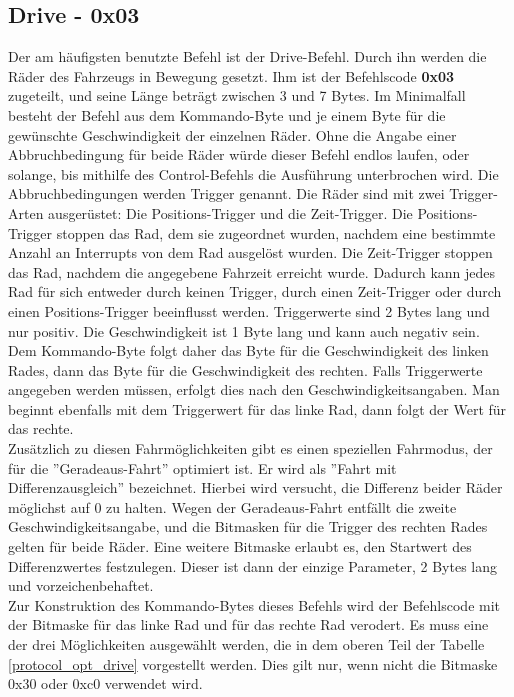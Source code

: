\subsection{Drive - 0x03}
Der am häufigsten benutzte Befehl ist der Drive-Befehl. Durch ihn werden die Räder des Fahrzeugs
in Bewegung gesetzt. Ihm ist der Befehlscode \textbf{0x03} zugeteilt, und seine Länge beträgt zwischen 3
und 7 Bytes. Im Minimalfall besteht der Befehl aus dem Kommando-Byte und je einem Byte für
die gewünschte Geschwindigkeit der einzelnen Räder. Ohne die Angabe einer Abbruchbedingung für
beide Räder würde dieser Befehl endlos laufen, oder solange, bis mithilfe des Control-Befehls
die Ausführung unterbrochen wird. Die Abbruchbedingungen werden Trigger genannt. 
Die Räder sind mit zwei Trigger-Arten ausgerüstet:
Die Positions-Trigger und die Zeit-Trigger. Die Positions-Trigger stoppen
das Rad, dem sie zugeordnet wurden, nachdem eine bestimmte Anzahl an Interrupts von dem Rad
ausgelöst wurden. Die Zeit-Trigger stoppen das Rad, nachdem die angegebene Fahrzeit erreicht
wurde. 
Dadurch kann jedes Rad für sich entweder durch keinen Trigger, durch einen Zeit-Trigger
oder durch einen Positions-Trigger beeinflusst werden.
Triggerwerte sind
2 Bytes lang und nur positiv. Die Geschwindigkeit ist 1 Byte lang und kann auch negativ sein.
Dem Kommando-Byte folgt daher das Byte für die Geschwindigkeit des linken Rades, dann
das Byte für die Geschwindigkeit des rechten. Falls Triggerwerte angegeben werden müssen,
erfolgt dies nach den Geschwindigkeitsangaben.
Man beginnt ebenfalls mit dem Triggerwert für das linke Rad, dann folgt der
Wert für das rechte.\\
Zusätzlich zu diesen Fahrmöglichkeiten gibt es einen speziellen Fahrmodus, der für
die ''Geradeaus-Fahrt'' optimiert ist. Er wird als ''Fahrt mit Differenzausgleich''
bezeichnet. Hierbei wird versucht, die Differenz beider Räder möglichst auf 0 zu
halten. Wegen der Geradeaus-Fahrt entfällt die zweite Geschwindigkeitsangabe, und 
die Bitmasken für die Trigger des rechten Rades gelten für beide Räder. Eine weitere
Bitmaske erlaubt es, den Startwert des Differenzwertes festzulegen. Dieser ist dann
der einzige Parameter, 2 Bytes lang und vorzeichenbehaftet.\\
Zur Konstruktion des Kommando-Bytes dieses Befehls wird der Befehlscode mit der Bitmaske
für das linke Rad und für das rechte Rad verodert. Es muss eine der drei Möglichkeiten
ausgewählt werden, die in dem oberen Teil der Tabelle \ref{protocol_opt_drive} vorgestellt werden.
Dies gilt nur, wenn nicht die Bitmaske 0x30 oder 0xc0 verwendet wird.
